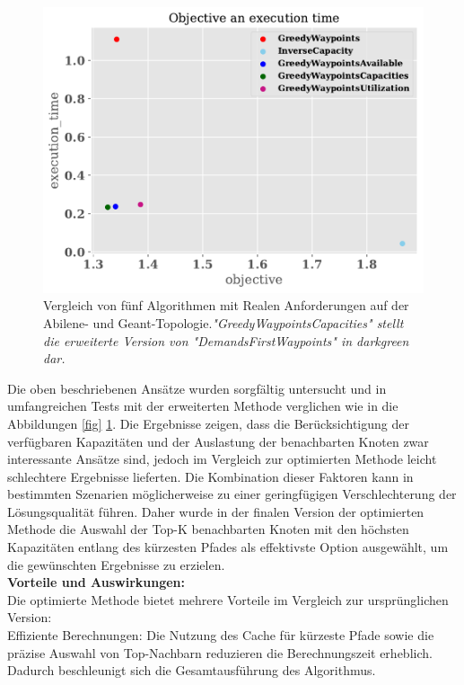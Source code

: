 \documentclass[sigconf, nonacm, review]{acmart}
\begin{document}
\begin{figure}
\centering
\includegraphics[width=\linewidth]{figures/execution_time.pdf}
\caption{Vergleich von fünf Algorithmen mit Realen Anforderungen auf der Abilene- und Geant-Topologie.\emph{"GreedyWaypointsCapacities" stellt die erweiterte Version von "DemandsFirstWaypoints" in darkgreen dar.}}
\label{fig1}
\end{figure}
Die oben beschriebenen Ansätze wurden sorgfältig untersucht und in umfangreichen Tests mit der erweiterten Methode verglichen wie in die Abbildungen \ref{fig} \ref{fig1}. Die Ergebnisse zeigen, dass die Berücksichtigung der verfügbaren Kapazitäten und der Auslastung der benachbarten Knoten zwar interessante Ansätze sind, jedoch im Vergleich zur optimierten Methode leicht schlechtere Ergebnisse lieferten. Die Kombination dieser Faktoren kann in bestimmten Szenarien möglicherweise zu einer geringfügigen Verschlechterung der Lösungsqualität führen. Daher wurde in der finalen Version der optimierten Methode die Auswahl der Top-K benachbarten Knoten mit den höchsten Kapazitäten entlang des kürzesten Pfades als effektivste Option ausgewählt, um die gewünschten Ergebnisse zu erzielen.\\
\textbf{Vorteile und Auswirkungen:}\\
Die optimierte Methode bietet mehrere Vorteile im Vergleich zur ursprünglichen Version:\\
Effiziente Berechnungen: Die Nutzung des Cache für kürzeste Pfade sowie die präzise Auswahl von Top-Nachbarn reduzieren die Berechnungszeit erheblich. Dadurch beschleunigt sich die Gesamtausführung des Algorithmus.\\
\end{document}
